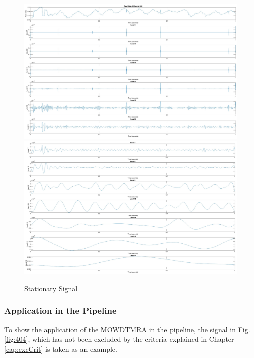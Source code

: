 \begin{figure}[p]
    \centering
    \includegraphics[width=\textwidth]{img/lev1.png}
    \includegraphics[width=\textwidth]{img/lev2.png}
    \caption{Stationary Signal}
    \label{fig:level1}
\end{figure}

\subsubsection{Application in the Pipeline}
To show the application of the MOWDTMRA in the pipeline, the signal in Fig. \ref{fig:404}, which has not been excluded by the criteria explained in Chapter \ref{cap:excCrit} is taken as an example.

